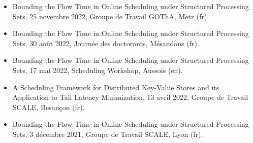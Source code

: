 \documentclass[12pt]{article}
\begin{document}
\begin{itemize}
  \item \foreignlanguage{english}{Bounding the Flow Time in Online Scheduling under Structured
  Processing Sets}, 25 novembre 2022, Groupe de Travail GOThA, Metz (fr).
  \item \foreignlanguage{english}{Bounding the Flow Time in Online Scheduling under Structured
  Processing Sets}, 30 août 2022, Journée des doctorants, Mésandans (fr).
  \item \foreignlanguage{english}{Bounding the Flow Time in Online Scheduling under Structured
  Processing Sets}, 17 mai 2022, Scheduling Workshop, Aussois (en).
  \item \foreignlanguage{english}{A Scheduling Framework for Distributed Key-Value Stores and
  its Application to Tail Latency Minimization}, 13 avril 2022, Groupe de Travail SCALE, Besançon (fr).
  \item \foreignlanguage{english}{Bounding the Flow Time in Online Scheduling under Structured
  Processing Sets}, 3 décembre 2021, Groupe de Travail SCALE, Lyon (fr).
\end{itemize}

% 
% 
\end{document}
